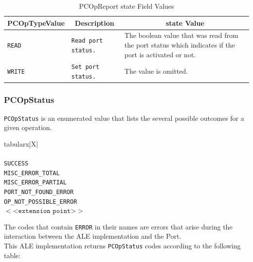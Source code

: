 \documentclass[11pt,a4paper,oneside]{article}
\newenvironment{bbox}%
{\begin{table}[h!]\begin{threeparttable}}%
{\end{threeparttable}\end{table}\FloatBarrier}
\newenvironment{bbox}
{\ifvmode\IgnorePar\fi \EndP\Tg<div class='bbox'>}{\Tg</div>\IgnoreIndent}
\begin{document}
\begin{table}[!h]
\begin{tabular}{
  |p{}%
  |p{}%
  |p{}|%
  }
\hline
\textbf{PCOpType}\newline\textbf{Value}&\multicolumn{1}{c|}{\textbf{Description}}&\multicolumn{1}{c|}{\textbf{state Value}}\\
\hline 
\texttt{READ} &\texttt{Read port status.}&The boolean value that was read from the port status which indicates if the port is activated or not.\\ \hline 
\texttt{WRITE} &\texttt{Set port status.}&The value is omitted. \\ \hline 
\end{tabular}
\caption{PCOpReport state Field Values}
\MakeLineNo
\end{table}
\FloatBarrier

\subsubsection{PCOpStatus}
\label{subsec: PcStat}
\texttt{PCOpStatus} is an enumerated value that lists the several possible outcomes for a given operation.

\begin{bbox}
\begin{edtable}{tabularx}{\linewidth}{|X|}
\hline 
{}
\\
\\
\texttt{SUCCESS}\\
\texttt{MISC\_ERROR\_TOTAL}\\
\texttt{MISC\_ERROR\_PARTIAL}\\
\texttt{PORT\_NOT\_FOUND\_ERROR}\\
\texttt{OP\_NOT\_POSSIBLE\_ERROR}\\
$<$<$\texttt{extension point}$>$>$\\
\hline
\end{edtable}
\end{bbox}

The codes that contain \texttt{ERROR} in their names are errors that arise during the interaction between the ALE implementation and the Port. \\
This ALE implementation returns \texttt{PCOpStatus} codes according to the following table:
\end{document}
